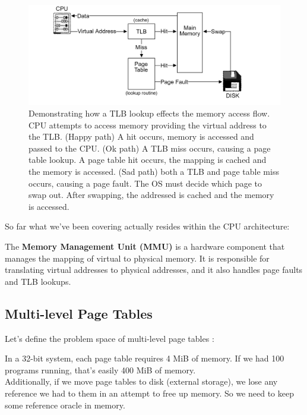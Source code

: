 \begin{figure}[h]
    \centering
    \includegraphics[width=\textwidth]{Sections/virt/tlb.png}
    
    \vspace{1em}
    \caption{Demonstrating how a TLB lookup effects the memory access flow. CPU attempts to access memory providing 
    the virtual address to the TLB. (Happy path) A hit occurs, memory is accessed and passed to the CPU. (Ok path) A TLB miss occurs, causing a page table lookup. A page table hit occurs, the mapping is cached and the memory is accessed. (Sad path) both a TLB and page table miss occurs, causing a page fault. The OS must decide 
    which page to swap out. After swapping, the addressed is cached and the memory is accessed.}
    
    \label{fig:virt7}
\end{figure}

\newpage 
\noindent
So far what we've been covering actually resides within the CPU architecture:
\begin{Def}

    The \textbf{Memory Management Unit (MMU)} is a hardware component that manages the mapping of virtual to physical memory. It is responsible for translating virtual addresses to physical addresses, and it also handles page faults and TLB lookups.
\end{Def}

\subsection{Multi-level Page Tables}

\noindent
Let's define the problem space of multi-level page tables \cite{neso_vm_multilevel}:
\begin{theo}

    In a 32-bit system, each page table requires 4 MiB of memory. If we had 100 programs running, that's easily 400 MiB of memory.\\

    \noindent
    Additionally, if we move page tables to disk (external storage), we lose any reference we had to them in an attempt to free up memory. So we need to keep some reference oracle in memory.
\end{theo}

